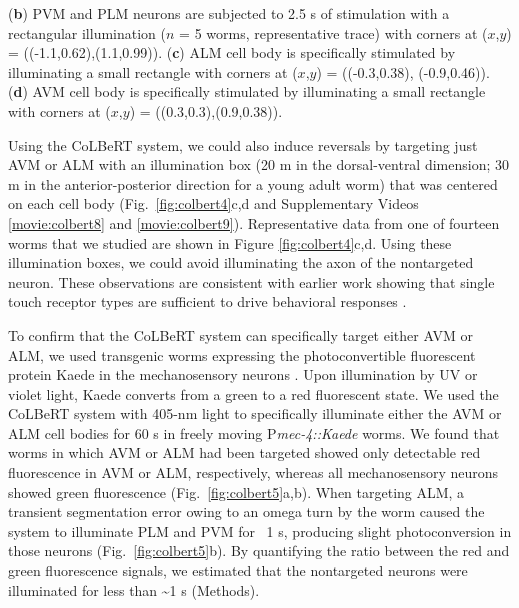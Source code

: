 \begin{FPfigure}
{(\textbf{b}) PVM and PLM neurons are subjected to 2.5 s of stimulation with a rectangular illumination ($n$ = 5 worms, representative trace) with corners at ($x$,$y$) = ((-1.1,0.62),(1.1,0.99)). (\textbf{c}) ALM cell body is specifically stimulated by illuminating a small rectangle with corners at ($x$,$y$) = ((-0.3,0.38), (-0.9,0.46)). 
(\textbf{d}) AVM cell body is specifically stimulated by illuminating a small rectangle with corners at ($x$,$y$) = ((0.3,0.3),(0.9,0.38)).\label{fig:colbert4}}
\end{FPfigure}

Using the CoLBeRT system, we could also induce reversals by targeting just AVM or ALM with an illumination box (20 \textmu m in the dorsal-ventral dimension; 30 \textmu m in the anterior-posterior direction for a young adult worm) that was centered on each cell body (Fig.~\ref{fig:colbert4}c,d and Supplementary Videos \ref{movie:colbert8} and \ref{movie:colbert9}). Representative data from one of fourteen worms that we studied are shown in Figure \ref{fig:colbert4}c,d. Using these illumination boxes, we could avoid illuminating the axon of the nontargeted neuron. These observations are consistent with earlier work showing that single touch receptor types are sufficient to drive behavioral responses \citep{chalfie_developmental_1981}.

To confirm that the CoLBeRT system can specifically target either AVM or ALM, we used transgenic worms expressing the photoconvertible fluorescent protein Kaede in the mechanosensory neurons \citep{ando_optical_2002}. Upon illumination by UV or violet light, Kaede converts from a green to a red fluorescent state. We used the CoLBeRT  system with 405-nm light to specifically illuminate either the AVM or ALM cell bodies for 60 s in freely moving P\textit{mec-4::Kaede} worms. We found that worms in which AVM or ALM had been targeted showed only detectable red fluorescence in AVM or ALM, respectively, whereas all mechanosensory neurons showed green fluorescence (Fig.~\ref{fig:colbert5}a,b). When targeting ALM, a transient segmentation error owing to an omega turn by the worm caused the system to illuminate PLM and PVM for ~1 s, producing slight photoconversion in those neurons (Fig.~\ref{fig:colbert5}b). By quantifying the ratio between the red and green fluorescence signals, we estimated that the nontargeted neurons were illuminated for less than \textasciitilde1 s (Methods).

